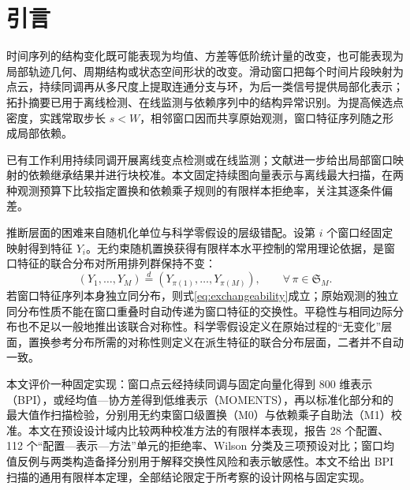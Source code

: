 \section{引言}\label{sec:intro}

时间序列的结构变化既可能表现为均值、方差等低阶统计量的改变，也可能表现为局部轨迹几何、周期结构或状态空间形状的改变。滑动窗口把每个时间片段映射为点云，持续同调再从多尺度上提取连通分支与环，为后一类信号提供局部化表示；拓扑摘要已用于离线检测、在线监测与依赖序列中的结构异常识别。为提高候选点密度，实践常取步长 $s<W$，相邻窗口因而共享原始观测，窗口特征序列随之形成局部依赖。

已有工作利用持续同调开展离线变点检测或在线监测；文献\cite{NieYue2026}进一步给出局部窗口映射的依赖继承结果并进行块校准。本文固定持续图向量表示与离线最大扫描，在两种观测预算下比较指定置换和依赖乘子规则的有限样本拒绝率，关注其逐条件偏差。

推断层面的困难来自随机化单位与科学零假设的层级错配。设第 $i$ 个窗口经固定映射得到特征 $Y_i$。无约束随机置换获得有限样本水平控制的常用理论依据，是窗口特征的联合分布对所用排列群保持不变：
\begin{equation}\label{eq:exchangeability}
 (Y_1,\ldots,Y_M)\overset{d}{=}(Y_{\pi(1)},\ldots,Y_{\pi(M)}),
 \qquad \forall\,\pi\in\mathfrak S_M .
\end{equation}
若窗口特征序列本身独立同分布，则式\eqref{eq:exchangeability}成立；原始观测的独立同分布性质不能在窗口重叠时自动传递为窗口特征的交换性。平稳性与相同边际分布也不足以一般地推出该联合对称性。科学零假设定义在原始过程的“无变化”层面，置换参考分布所需的对称性则定义在派生特征的联合分布层面，二者并不自动一致。

本文评价一种固定实现：窗口点云经持续同调与固定向量化得到 800 维表示（BPI），或经均值—协方差得到低维表示（MOMENTS），再以标准化部分和的最大值作扫描检验，分别用无约束窗口级置换（M0）与依赖乘子自助法（M1）校准。本文在预设设计域内比较两种校准方法的有限样本表现，报告 28 个配置、112 个“配置—表示—方法”单元的拒绝率、Wilson 分类及三项预设对比；窗口均值反例与两类构造备择分别用于解释交换性风险和表示敏感性。本文不给出 BPI 扫描的通用有限样本定理，全部结论限定于所考察的设计网格与固定实现。
